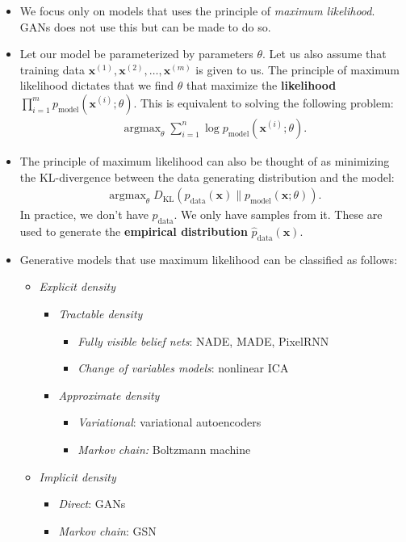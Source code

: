 \documentclass[10pt]{article}
\newcommand{\ve}[1]{\mathbf{#1}}
\DeclareMathOperator*{\argmax}{argmax}
\begin{document}
  \begin{itemize}
  	\item We focus only on models that uses the principle of \emph{maximum likelihood}. GANs does not use this but can be made to do so.

  	\item Let our model be parameterized by parameters $\theta$. Let us also assume that training data $\ve{x}^{(1)}, \ve{x}^{(2)}, \dotsc, \ve{x}^{(m)}$ is given to us. The principle of maximum likelihood dictates that we find $\theta$ that maximize the \textbf{likelihood} $\prod_{i=1}^m p_{\mathrm{model}}(\ve{x}^{(i)}; \theta)$. This is equivalent to solving the following problem:
  	\begin{align*}
  		\argmax_{\theta} \sum_{i=1}^n \log p_{\mathrm{model}}(\ve{x}^{(i)}; \theta).
  	\end{align*}
  	
  	\item The principle of maximum likelihood can also be thought of as minimizing the KL-divergence between the data generating distribution and the model:
  	\begin{align*}
  		\argmax_{\theta} D_{\mathrm{KL}}(p_{\mathrm{data}}(\ve{x})\|p_{\mathrm{model}}(\ve{x};\theta)).
  	\end{align*}
  	In practice, we don't have $p_{\mathrm{data}}$. We only have samples from it. These are used to generate the \textbf{empirical distribution} $\hat{p}_{\mathrm{data}}(\ve{x})$.

  	\item Generative models that use maximum likelihood can be classified as follows:
  	\begin{itemize}
  	  \item \emph{Explicit density}
  	  \begin{itemize}
  	  	\item \emph{Tractable density}
  	  	\begin{itemize}
  	  	  \item \emph{Fully visible belief nets}: NADE, MADE, PixelRNN
  	  	  \item \emph{Change of variables models}: nonlinear ICA
  	  	\end{itemize}
  	  	\item \emph{Approximate density}
  	  	\begin{itemize}
  	  	  \item \emph{Variational}: variational autoencoders
  	  	  \item \emph{Markov chain:} Boltzmann machine
  	  	\end{itemize}
  	  \end{itemize}
  	  \item \emph{Implicit density}
  	  \begin{itemize}
  	  	\item \emph{Direct}: GANs
  	  	\item \emph{Markov chain}: GSN
  	  \end{itemize}
  	\end{itemize}  	
  \end{itemize}
\end{document}
